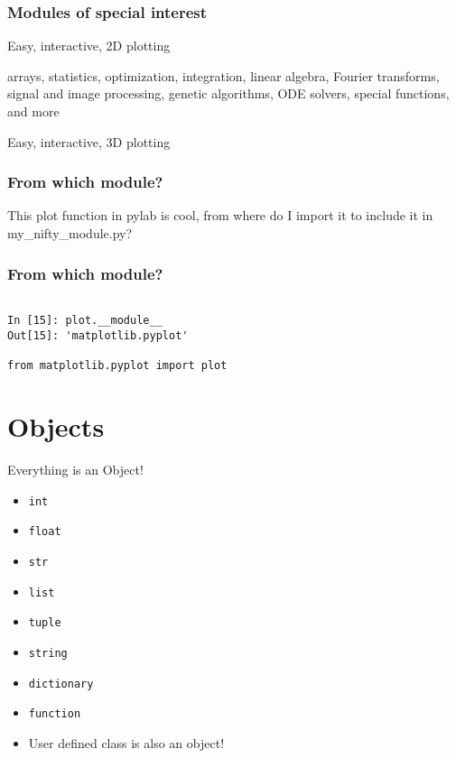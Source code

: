 \documentclass[14pt,compress]{beamer}
\newcommand{\typ}[1]{\lstinline{#1}}
\begin{document}
\begin{frame}[fragile]
  \frametitle{Modules of special interest}
  \begin{description}[matplotlibfor2d]
    \item[\texttt{pylab}] Easy, interactive, 2D plotting

    \item[\texttt{scipy}] arrays, statistics, optimization, integration, linear
            algebra, Fourier transforms, signal and image processing,
            genetic algorithms, ODE solvers, special functions, and more

    \item[\texttt{Mayavi}] Easy, interactive, 3D plotting
  \end{description}
\end{frame}

\begin{frame}[fragile]
  \frametitle{From which module?}
  
This plot function in pylab is cool, 
from where do I import it to include it in 
my\_nifty\_module.py?
  
\end{frame}

\begin{frame}[fragile]
  \frametitle{From which module?}
  \begin{lstlisting}
   
In [15]: plot.__module__
Out[15]: 'matplotlib.pyplot'

from matplotlib.pyplot import plot

  \end{lstlisting}
\end{frame}

\section{Objects}
\begin{frame}{Everything is an Object!}
  \begin{itemize}
    \item \typ{int}
    \item \typ{float}
    \item \typ{str}
    \item \typ{list}
    \item \typ{tuple}
    \item \typ{string}
    \item \typ{dictionary}
    \item \typ{function}
    \item User defined class is also an object!
  \end{itemize}
\end {frame}
\end{document}
